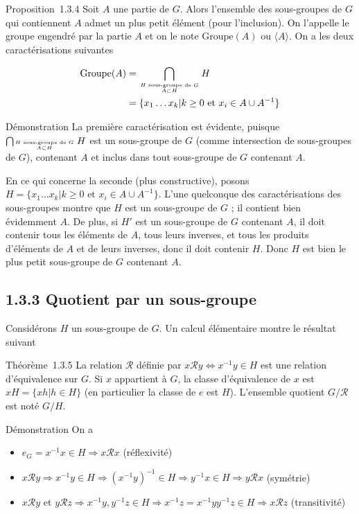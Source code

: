 Proposition~1.3.4 Soit $A$ une partie de $G$. Alors l'ensemble des
sous-groupes de $G$ qui contiennent $A$ admet un plus petit élément (pour
l'inclusion). On l'appelle le groupe engendré par la partie $A$ et on le
note $\text{Groupe}(A)$ ou $\langle A \rangle$. On a les deux caractérisations suivantes

\begin{align*} 
\text{Groupe}(A) &= \bigcap_{H \text{ sous-groupe de } G \atop A \subset H} H \\
&= \{x_1 \ldots x_k | k \geq 0 \text{ et } x_i \in A \cup A^{-1}\}
\end{align*}

Démonstration La première caractérisation est évidente, puisque
$\bigcap_{H \text{ sous-groupe de } G \atop A \subset H} H$ est un sous-groupe de $G$ (comme intersection de sous-groupes de $G$),
contenant $A$ et inclus dans tout sous-groupe de $G$ contenant $A$.

En ce qui concerne la seconde (plus constructive), posons $H =
\{x_1 \ldots x_k | k \geq 0 \text{ et } x_i \in A \cup A^{-1}\}$. L'une quelconque des caractérisations
des sous-groupes montre que $H$ est un sous-groupe de $G$ ; il contient bien
évidemment $A$. De plus, si $H'$ est un sous-groupe de $G$ contenant $A$, il
doit contenir tous les éléments de $A$, tous leurs inverses, et tous les
produits d'éléments de $A$ et de leurs inverses, donc il doit contenir $H$.
Donc $H$ est bien le plus petit sous-groupe de $G$ contenant $A$.

\subsection{1.3.3 Quotient par un sous-groupe}

Considérons $H$ un sous-groupe de $G$. Un calcul élémentaire montre le
résultat suivant

Théorème~1.3.5 La relation $\mathcal{R}$ définie par $x \mathcal{R} y
\Leftrightarrow x^{-1}y \in H$ est une relation
d'équivalence sur $G$. Si $x$ appartient à $G$, la classe d'équivalence de $x$
est $xH = \{xh | h \in H\}$ (en particulier la classe de $e$ est $H$). L'ensemble
quotient $G/\mathcal{R}$ est noté $G/H$.

Démonstration On a

\begin{itemize}
\itemsep1pt\parskip0pt
\item
  $e_G = x^{-1}x \in H \Rightarrow x \mathcal{R} x$ (réflexivité)
\item
  $x \mathcal{R} y \Rightarrow x^{-1}y \in H \Rightarrow (x^{-1}y)^{-1} \in H \Rightarrow y^{-1}x \in H \Rightarrow y \mathcal{R} x$ (symétrie)
\item
  $x \mathcal{R} y$ et $y \mathcal{R} z \Rightarrow x^{-1}y, y^{-1}z \in H \Rightarrow x^{-1}z = x^{-1}y y^{-1}z \in H \Rightarrow x \mathcal{R} z$ (transitivité)
\end{itemize}

